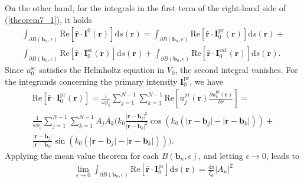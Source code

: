 \documentclass{article}
\begin{document}
On the other hand, for the integrals in the first term of the right-hand side of (\ref{theorem7_1}), it holds
%
\begin{align}
\nonumber
\int_{\partial B(\mathbf{b}_n,\epsilon)}\mathrm{Re}\left[\hat{\mathbf{r}}\cdot\mathbf{I}^0(\mathbf{r})\right]\mathrm{d}s(\mathbf{r})=\int_{\partial B(\mathbf{b}_n,\epsilon)}\mathrm{Re}\left[\hat{\mathbf{r}}\cdot\mathbf{I}_0^{\mathrm{pr}}(\mathbf{r})\right]\mathrm{d}s(\mathbf{r})+\\
\label{theorem7_3}\int_{\partial B(\mathbf{b}_n,\epsilon)}\mathrm{Re}\left[\hat{\mathbf{r}}\cdot\mathbf{I}_0^{\mathrm{sc}}(\mathbf{r})\right]\mathrm{d}s(\mathbf{r})+\int_{\partial B(\mathbf{b}_n,\epsilon)}\mathrm{Re}\left[\hat{\mathbf{r}}\cdot\mathbf{I}_0^{\mathrm{ext}}(\mathbf{r})\right]\mathrm{d}s(\mathbf{r}).
\end{align}
%
Since $u_0^{\mathrm{sc}}$ satisfies the Helmholtz equation in $V_0$, the second integral vanishes. For the integrands concerning the primary intensity $\mathbf{I}_0^{\mathrm{pr}}$, we have
%
\begin{align}
\nonumber
\mathrm{Re}\left[\hat{\mathbf{r}}\cdot\mathbf{I}_0^{\mathrm{pr}}(\mathbf{r})\right]=\frac{\mathrm{i}}{\omega\rho_0}\sum_{j=1}^{N-1}\sum_{k=1}^{N-1}\mathrm{Re}\left[u_j^{\mathrm{pr}}(\mathbf{r})\frac{\partial\overline{u_k^{\mathrm{pr}}}(\mathbf{r})}{\partial r}\right]=\\\nonumber\frac{1}{\omega\rho_0}\sum_{j=1}^{N-1}\sum_{k=1}^{N-1}A_j\overline{A_k}\Bigg(k_0\frac{\lvert\mathbf{r}-\mathbf{b}_j\rvert^2}{\lvert\mathbf{r}-\mathbf{b}_k\rvert^2}\cos{\left(k_0\left(\lvert\mathbf{r}-\mathbf{b}_j\rvert-\lvert\mathbf{r}-\mathbf{b}_k\rvert\right)\right)}+\\\frac{\lvert\mathbf{r}-\mathbf{b}_j\rvert}{\lvert\mathbf{r}-\mathbf{b}_k\rvert}\sin{\left(k_0\left(\lvert\mathbf{r}-\mathbf{b}_j\rvert-\lvert\mathbf{r}-\mathbf{b}_k\rvert\right)\right)}\Bigg).
\label{theorem7_31}
\end{align}
%
Applying the mean value theorem for each $B(\mathbf{b}_n,\epsilon)$, and letting $\epsilon\rightarrow0$, leads to
%       
%
\begin{align}
\label{theorem7_6}
\lim_{\epsilon\rightarrow0}\int_{\partial B(\mathbf{b}_n,\epsilon)}\mathrm{Re}\left[\hat{\mathbf{r}}\cdot\mathbf{I}_0^{\mathrm{pr}}\right]\mathrm{d}s(\mathbf{r})=\frac{4\pi}{\zeta_0}\lvert A_n\rvert^2
\end{align}
%
\end{document}
